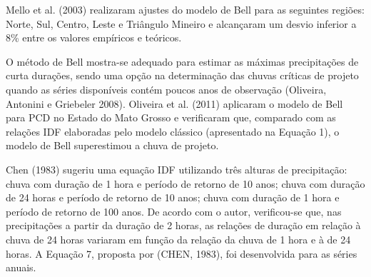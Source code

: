Mello et al. (2003) realizaram ajustes do modelo de Bell para as seguintes regiões: Norte, Sul, Centro, Leste e Triângulo Mineiro e alcançaram um desvio inferior a 8\% entre os valores empíricos e teóricos.

O método de Bell mostra-se adequado para estimar as máximas precipitações de curta durações, sendo uma opção na determinação das chuvas críticas de projeto quando as séries disponíveis contém poucos anos de observação (Oliveira, Antonini e Griebeler 2008). Oliveira et al. (2011) aplicaram o modelo de Bell para PCD no Estado do Mato Grosso e verificaram que, comparado com as relações IDF elaboradas pelo modelo clássico (apresentado na Equação 1), o modelo de Bell superestimou a chuva de projeto.

Chen (1983) sugeriu uma equação IDF utilizando três alturas de precipitação: chuva com duração de 1 hora e período de retorno de 10 anos; chuva com duração de 24 horas e período de retorno de 10 anos; chuva com duração de 1 hora e período de retorno de 100 anos. De acordo com o autor, verificou-se que, nas precipitações a partir da duração de 2 horas, as relações de duração em relação à chuva de 24 horas variaram em função da relação da chuva de 1 hora e à de 24 horas. A Equação 7, proposta por (CHEN, 1983), foi desenvolvida para as séries anuais.